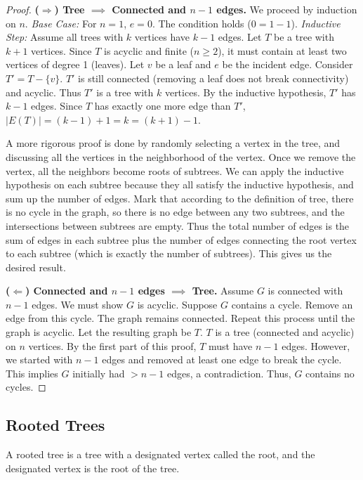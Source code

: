 \documentclass[oneside]{book}
\begin{document}
\begin{proof}
\textbf{($\Rightarrow$) Tree $\implies$ Connected and $n-1$ edges.}
We proceed by induction on $n$.
\textit{Base Case:} For $n=1$, $e=0$. The condition holds ($0 = 1-1$).
\textit{Inductive Step:} Assume all trees with $k$ vertices have $k-1$ edges. Let $T$ be a tree with $k+1$ vertices.
Since $T$ is acyclic and finite ($n \ge 2$), it must contain at least two vertices of degree 1 (leaves). Let $v$ be a leaf and $e$ be the incident edge.
Consider $T' = T - \{v\}$. $T'$ is still connected (removing a leaf does not break connectivity) and acyclic. Thus $T'$ is a tree with $k$ vertices.
By the inductive hypothesis, $T'$ has $k-1$ edges. Since $T$ has exactly one more edge than $T'$, $|E(T)| = (k-1) + 1 = k = (k+1)-1$.

A more rigorous proof is done by randomly selecting a vertex in the tree, and discussing all the vertices in the neighborhood of the vertex. Once we remove the vertex, all the neighbors become roots of subtrees. We can apply the inductive hypothesis on each subtree because they all satisfy the inductive hypothesis, and sum up the number of edges. Mark that according to the definition of tree, there is no cycle in the graph, so there is no edge between any two subtrees, and the intersections between subtrees are empty. Thus the total number of edges is the sum of edges in each subtree plus the number of edges connecting the root vertex to each subtree (which is exactly the number of subtrees). This gives us the desired result.

\textbf{($\Leftarrow$) Connected and $n-1$ edges $\implies$ Tree.}
Assume $G$ is connected with $n-1$ edges. We must show $G$ is acyclic.
Suppose $G$ contains a cycle. Remove an edge from this cycle. The graph remains connected. Repeat this process until the graph is acyclic. Let the resulting graph be $T$.
$T$ is a tree (connected and acyclic) on $n$ vertices. By the first part of this proof, $T$ must have $n-1$ edges.
However, we started with $n-1$ edges and removed at least one edge to break the cycle. This implies $G$ initially had $> n-1$ edges, a contradiction. Thus, $G$ contains no cycles.
\end{proof}

\subsection{Rooted Trees}

\begin{definition}
A rooted tree is a tree with a designated vertex called the root, and the designated vertex is the root of the tree.
\end{definition}
\end{document}
